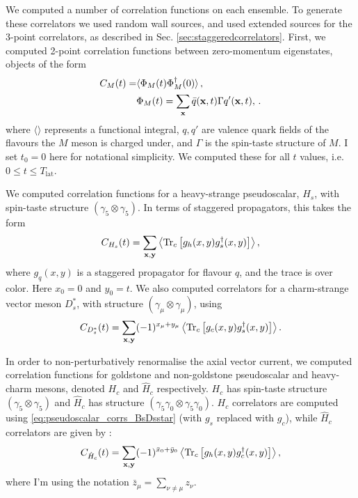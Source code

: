 We computed a number of correlation functions on each ensemble. To generate these correlators we used random wall sources, and used extended sources for the 3-point correlators, as described in Sec. \ref{sec:staggeredcorrelators}. First, we computed 2-point correlation functions between zero-momentum eigenstates, objects of the form
\begin{align}
  C_{M}(t) =& \langle \Phi_M (t) \Phi_M^{\dagger}(0) \rangle\,, \\ 
  &\Phi_M(t) = \sum_{{\bf{x}}} \bar{q}({\bf{x}},t) \Gamma q'({\bf{x}},t), \nonumber\,.
\end{align}
where $\langle \rangle$ represents a functional integral, $q,q'$ are valence quark fields of the flavours the $M$ meson is charged under, and $\Gamma$ is the spin-taste structure of $M$. I set $t_0=0$ here for notational simplicity. We computed these for all $t$ values, i.e. $0\leq t \leq T_{\text{lat}}$. 

We computed correlation functions for a heavy-strange pseudoscalar, $H_s$, with spin-taste structure $(\gamma_5\otimes \gamma_5)$. In terms of staggered propagators, this takes the form
\begin{align}
  C_{H_s}(t) = \sum_{\bf{x},\bf{y}} \left\langle \text{Tr}_c\left[ g_h(x,y) g_s^{\dagger}(x,y) \right] \right\rangle,
  \label{eq:pseudoscalar_corrs_BsDsstar}
\end{align}
where $g_q(x,y)$ is a staggered propagator for flavour $q$, and the trace is over color. Here $x_0=0$ and $y_0=t$. We also computed correlators for a charm-strange vector meson $D_s^*$, with structure $(\gamma_{\mu}\otimes \gamma_{\mu})$, using
\begin{align}
  C_{D_s^*}(t) = \sum_{\bf{x},\bf{y}} (-1)^{x_{\mu}+y_{\mu}} \left\langle \text{Tr}_c\left[ g_c(x,y) g_s^{\dagger}(x,y) \right] \right\rangle.
\end{align}

In order to non-perturbatively renormalise the axial vector current, we computed correlation functions for goldstone and non-goldstone pseudoscalar and heavy-charm mesons, denoted $H_c$ and $\hat{H}_c$ respectively. $H_c$ has spin-taste structure $(\gamma_5\otimes \gamma_5)$ and $\hat{H}_c$ has structure $(\gamma_5\gamma_0\otimes \gamma_5\gamma_0)$. $H_c$ correlators are computed using \eqref{eq:pseudoscalar_corrs_BsDsstar} (with $g_s$ replaced with $g_c$), while $\hat{H}_c$ correlators are given by \cite{PhysRevD.98.030001}:
\begin{align}
  C_{\hat{H}_c}(t) = \sum_{\bf{x},\bf{y}}(-1)^{\bar{x}_0+\bar{y}_0} \left\langle \text{Tr}_c\left[ g_h(x,y) g^{\dagger}_c(x,y) \right] \right\rangle,
\end{align}
where I'm using the notation $\bar{z}_{\mu} = \sum_{\nu\neq\mu} z_{\nu}$.

